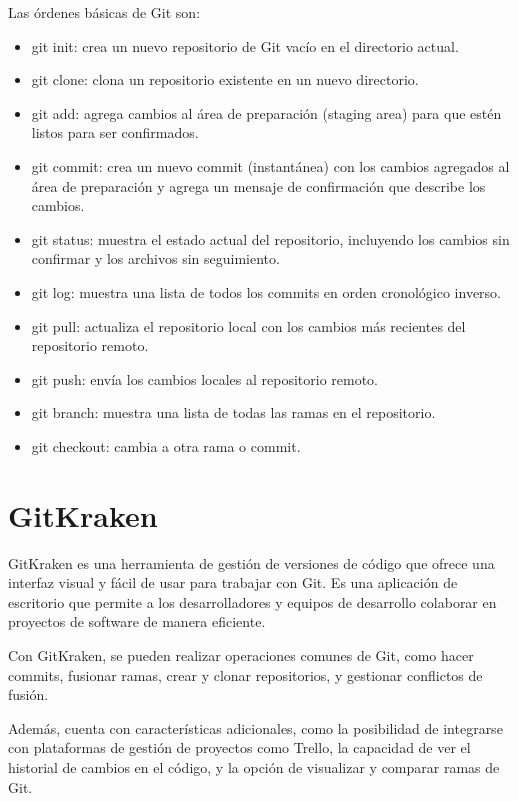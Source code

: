 Las órdenes básicas de Git son:
\begin{itemize}
    \item git init: crea un nuevo repositorio de Git vacío en el directorio actual.
    \item git clone: clona un repositorio existente en un nuevo directorio.
    \item git add: agrega cambios al área de preparación (staging area) para que estén
          listos para ser confirmados.
    \item git commit: crea un nuevo commit (instantánea) con los cambios agregados al
          área de preparación y agrega un mensaje de confirmación que describe los
          cambios.
    \item git status: muestra el estado actual del repositorio, incluyendo los cambios
          sin confirmar y los archivos sin seguimiento.
    \item git log: muestra una lista de todos los commits en orden cronológico inverso.
    \item git pull: actualiza el repositorio local con los cambios más recientes del
          repositorio remoto.
    \item git push: envía los cambios locales al repositorio remoto.
    \item git branch: muestra una lista de todas las ramas en el repositorio.
    \item git checkout: cambia a otra rama o commit.
\end{itemize}

\section{GitKraken}\label{git-kraken}
GitKraken es una herramienta de gestión de versiones de código que ofrece una
interfaz visual y fácil de usar para trabajar con Git. Es una aplicación de
escritorio que permite a los desarrolladores y equipos de desarrollo colaborar
en proyectos de software de manera eficiente.

Con GitKraken, se pueden realizar operaciones comunes de Git, como hacer
commits, fusionar ramas, crear y clonar repositorios, y gestionar conflictos de
fusión.

Además, cuenta con características adicionales, como la posibilidad de
integrarse con plataformas de gestión de proyectos como Trello, la capacidad de
ver el historial de cambios en el código, y la opción de visualizar y comparar
ramas de Git.

